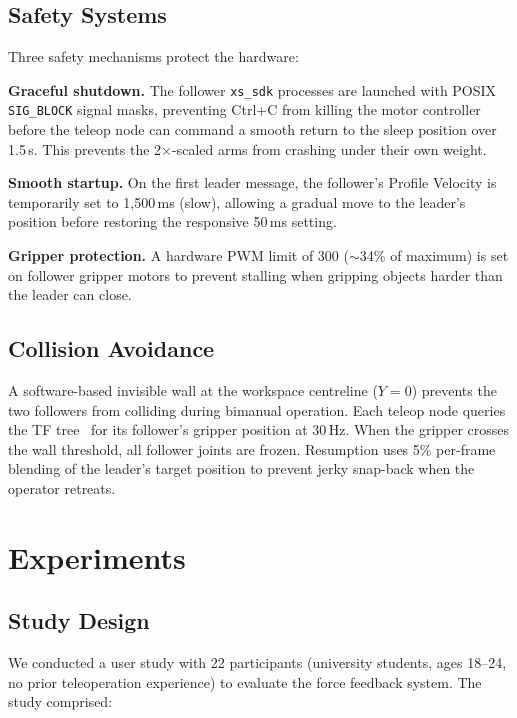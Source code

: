 \documentclass[conference]{IEEEtran}
\begin{document}
\subsection{Safety Systems}

Three safety mechanisms protect the hardware:

\textbf{Graceful shutdown.} The follower \texttt{xs\_sdk} processes are launched with POSIX \texttt{SIG\_BLOCK} signal masks, preventing Ctrl+C from killing the motor controller before the teleop node can command a smooth return to the sleep position over 1.5\,s. This prevents the 2$\times$-scaled arms from crashing under their own weight.

\textbf{Smooth startup.} On the first leader message, the follower's Profile Velocity is temporarily set to 1,500\,ms (slow), allowing a gradual move to the leader's position before restoring the responsive 50\,ms setting.

\textbf{Gripper protection.} A hardware PWM limit of 300 ($\sim$34\% of maximum) is set on follower gripper motors to prevent stalling when gripping objects harder than the leader can close.

\subsection{Collision Avoidance}

A software-based invisible wall at the workspace centreline ($Y = 0$) prevents the two followers from colliding during bimanual operation. Each teleop node queries the TF tree~\cite{foote2013tf} for its follower's gripper position at 30\,Hz. When the gripper crosses the wall threshold, all follower joints are frozen. Resumption uses 5\% per-frame blending of the leader's target position to prevent jerky snap-back when the operator retreats.

\section{Experiments}

\subsection{Study Design}

We conducted a user study with 22 participants (university students, ages 18--24, no prior teleoperation experience) to evaluate the force feedback system. The study comprised:
\end{document}
